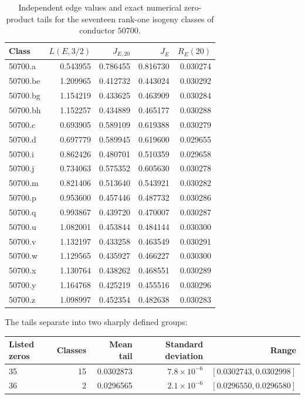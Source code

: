 \documentclass[11pt,reqno]{amsart}
\theoremstyle{remark}
\begin{document}
\begin{table}[H]
\centering
\small
\caption{Independent edge values and exact numerical zero-product tails for the seventeen rank-one isogeny classes of conductor $50700$.}
\label{tab:L32-tail}
\begin{tabular}{@{}lrrrr@{}}
\toprule
Class & $L(E,3/2)$ & $J_{E,20}$ & $J_E$ & $R_E(20)$\\
\midrule
50700.a  & 0.543955 & 0.786455 & 0.816730 & 0.030274\\
50700.be & 1.209965 & 0.412732 & 0.443024 & 0.030292\\
50700.bg & 1.154219 & 0.433625 & 0.463909 & 0.030284\\
50700.bh & 1.152257 & 0.434889 & 0.465177 & 0.030288\\
50700.c  & 0.693905 & 0.589109 & 0.619388 & 0.030279\\
50700.d  & 0.697779 & 0.589945 & 0.619600 & 0.029655\\
50700.i  & 0.862426 & 0.480701 & 0.510359 & 0.029658\\
50700.j  & 0.734063 & 0.575352 & 0.605630 & 0.030278\\
50700.m  & 0.821406 & 0.513640 & 0.543921 & 0.030282\\
50700.p  & 0.953600 & 0.457446 & 0.487732 & 0.030286\\
50700.q  & 0.993867 & 0.439720 & 0.470007 & 0.030287\\
50700.u  & 1.082001 & 0.453844 & 0.484144 & 0.030300\\
50700.v  & 1.132197 & 0.433258 & 0.463549 & 0.030291\\
50700.w  & 1.129565 & 0.435927 & 0.466227 & 0.030300\\
50700.x  & 1.130764 & 0.438262 & 0.468551 & 0.030289\\
50700.y  & 1.164768 & 0.425219 & 0.455516 & 0.030296\\
50700.z  & 1.098997 & 0.452354 & 0.482638 & 0.030283\\
\bottomrule
\end{tabular}
\end{table}

The tails separate into two sharply defined groups:
\begin{center}
\small
\begin{tabular}{@{}lrrrr@{}}
\toprule
Listed zeros & Classes & Mean tail & Standard deviation & Range\\
\midrule
35 & 15 & 0.0302873 & $7.8\times10^{-6}$ & $[0.0302743,0.0302998]$\\
36 & 2  & 0.0296565 & $2.1\times10^{-6}$ & $[0.0296550,0.0296580]$\\
\bottomrule
\end{tabular}
\end{center}
\end{document}
